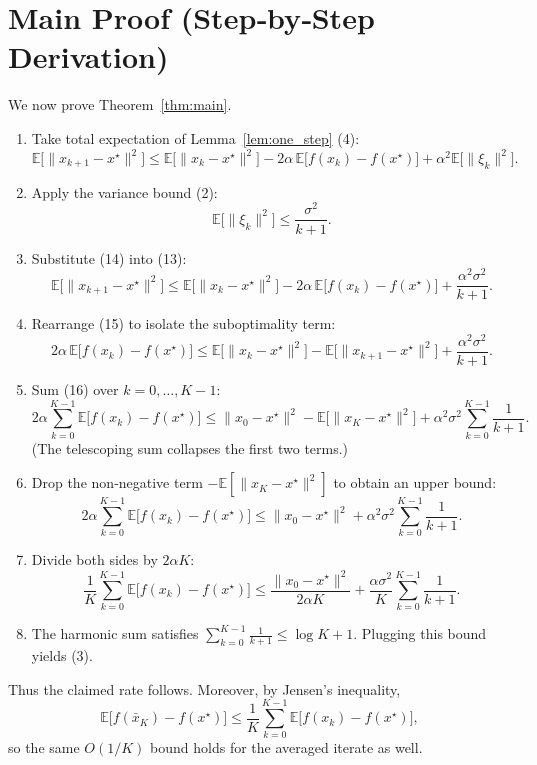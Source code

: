 \documentclass{article}
\begin{document}
\section*{Main Proof (Step‑by‑Step Derivation)}
We now prove Theorem~\ref{thm:main}.

\begin{enumerate}[label=[Step \arabic*],leftmargin=*]
\item Take total expectation of Lemma~\ref{lem:one_step} (4):
\[
\mathbb{E}\!\bigl[\|x_{k+1}-x^{\star}\|^{2}\bigr]
\le
\mathbb{E}\!\bigl[\|x_{k}-x^{\star}\|^{2}\bigr]
-2\alpha\,\mathbb{E}\!\bigl[f(x_{k})-f(x^{\star})\bigr]
+\alpha^{2}\mathbb{E}\!\bigl[\|\xi_{k}\|^{2}\bigr].
\tag{13}
\]
\item Apply the variance bound (2):
\[
\mathbb{E}\!\bigl[\|\xi_{k}\|^{2}\bigr]\le\frac{\sigma^{2}}{k+1}.
\tag{14}
\]
\item Substitute (14) into (13):
\[
\mathbb{E}\!\bigl[\|x_{k+1}-x^{\star}\|^{2}\bigr]
\le
\mathbb{E}\!\bigl[\|x_{k}-x^{\star}\|^{2}\bigr]
-2\alpha\,\mathbb{E}\!\bigl[f(x_{k})-f(x^{\star})\bigr]
+\frac{\alpha^{2}\sigma^{2}}{k+1}.
\tag{15}
\]
\item Rearrange (15) to isolate the suboptimality term:
\[
2\alpha\,\mathbb{E}\!\bigl[f(x_{k})-f(x^{\star})\bigr]
\le
\mathbb{E}\!\bigl[\|x_{k}-x^{\star}\|^{2}\bigr]
-
\mathbb{E}\!\bigl[\|x_{k+1}-x^{\star}\|^{2}\bigr]
+\frac{\alpha^{2}\sigma^{2}}{k+1}.
\tag{16}
\]
\item Sum (16) over $k=0,\dots ,K-1$:
\[
2\alpha\sum_{k=0}^{K-1}\mathbb{E}\!\bigl[f(x_{k})-f(x^{\star})\bigr]
\le
\|x_{0}-x^{\star}\|^{2}
-
\mathbb{E}\!\bigl[\|x_{K}-x^{\star}\|^{2}\bigr]
+\alpha^{2}\sigma^{2}\sum_{k=0}^{K-1}\frac{1}{k+1}.
\tag{17}
\]
(The telescoping sum collapses the first two terms.)
\item Drop the non‑negative term $-\mathbb{E}[\|x_{K}-x^{\star}\|^{2}]$ to obtain an upper bound:
\[
2\alpha\sum_{k=0}^{K-1}\mathbb{E}\!\bigl[f(x_{k})-f(x^{\star})\bigr]
\le
\|x_{0}-x^{\star}\|^{2}
+\alpha^{2}\sigma^{2}\sum_{k=0}^{K-1}\frac{1}{k+1}.
\tag{18}
\]
\item Divide both sides by $2\alpha K$:
\[
\frac{1}{K}\sum_{k=0}^{K-1}\mathbb{E}\!\bigl[f(x_{k})-f(x^{\star})\bigr]
\le
\frac{\|x_{0}-x^{\star}\|^{2}}{2\alpha K}
+\frac{\alpha\sigma^{2}}{K}\sum_{k=0}^{K-1}\frac{1}{k+1}.
\tag{19}
\]
\item The harmonic sum satisfies $\sum_{k=0}^{K-1}\frac{1}{k+1}\le\log K+1$.  Plugging this bound yields (3).
\end{enumerate}
Thus the claimed rate follows.  Moreover, by Jensen’s inequality,
\[
\mathbb{E}\!\bigl[f(\bar x_{K})-f(x^{\star})\bigr]
\le
\frac{1}{K}\sum_{k=0}^{K-1}\mathbb{E}\!\bigl[f(x_{k})-f(x^{\star})\bigr],
\]
so the same $O(1/K)$ bound holds for the averaged iterate as well.
\end{document}
